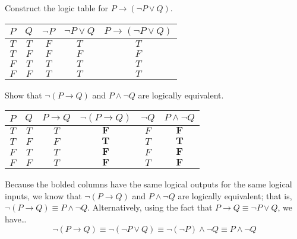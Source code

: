 \documentclass[12pt,letterpaper]{exam}
\begin{document}
\examtitle
{} 
\scores
\bottomline
\newpage

\begin{questions}

\newpage
\question[10] Construct the logic table for $P \to (\neg P \vee Q)$. \pspace

\sol \par
	\begin{table}[h]
	\centering
	\begin{tabular}{c|c||c|c||c}
	$P$ & $Q$ & $\neg P$ & $\neg P \vee Q$ & $P \to (\neg P \vee Q)$ \\ \hline
	$T$ & $T$ & $F$ & $T$ & $T$ \\
	$T$ & $F$ & $F$ & $F$ & $F$ \\
	$F$ & $T$ & $T$ & $T$ & $T$ \\
	$F$ & $F$ & $T$ & $T$ & $T$
	\end{tabular}
	\end{table}



\newpage
\question[10] Show that $\neg (P \to Q)$ and $P \wedge \neg Q$ are logically equivalent. \pspace

\sol \par
	\begin{table}[h]
	\centering
	\begin{tabular}{c|c||c|c||c|c}
	$P$ & $Q$ & $P \to Q$ & $\neg (P \to Q)$ & $\neg Q$ & $P \wedge \neg Q$ \\ \hline
	$T$ & $T$ & $T$ & $\mathbf{F}$ & $F$ & $\mathbf{F}$ \\
	$T$ & $F$ & $F$ & $\mathbf{T}$ & $T$ & $\mathbf{T}$ \\
	$F$ & $T$ & $T$ & $\mathbf{F}$ & $F$ & $\mathbf{F}$ \\
	$F$ & $F$ & $T$ & $\mathbf{F}$ & $T$ & $\mathbf{F}$ 
	\end{tabular}
	\end{table} \par
Because the bolded columns have the same logical outputs for the same logical inputs, we know that $\neg (P \to Q)$ and $P \wedge \neg Q$ are logically equivalent; that is, $\neg (P \to Q) \equiv P \wedge \neg Q$. Alternatively, using the fact that $P \to Q \equiv \neg P \vee Q$, we have\dots
	\[
	\neg (P \to Q) \equiv \neg (\neg P \vee Q) \equiv \neg (\neg P) \wedge \neg Q \equiv P \wedge \neg Q
	\]




\end{questions}
\end{document}
